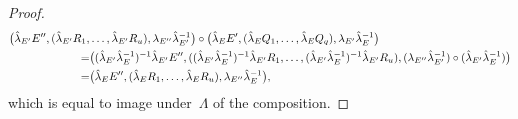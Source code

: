 \begin{proof}
\begin{align*}
\big(\hat{\lambda}_{E'}E'',(\hat{\lambda}_{E'}R_1,&\dots,\hat{\lambda}_{E'}R_u),\lambda_{E''}\hat{\lambda}_{E'}^{-1}\big)\circ \big(\hat{\lambda}_EE',(\hat{\lambda}_EQ_1,\dots,\hat{\lambda}_EQ_q),\lambda_{E'}\hat{\lambda}_E^{-1}\big)\\
=&\big((\hat{\lambda}_{E'}\hat{\lambda}_E^{-1})^{-1}\hat{\lambda}_{E'}E'',((\hat{\lambda}_{E'}\hat{\lambda}_E^{-1})^{-1}\hat{\lambda}_{E'}R_1,\dots,(\hat{\lambda}_{E'}\hat{\lambda}_E^{-1})^{-1}\hat{\lambda}_{E'}R_u),(\lambda_{E''}\hat{\lambda}_{E'}^{-1})\circ (\hat{\lambda}_{E'}\hat{\lambda}_E^{-1})\big)\\
=&\big(\hat{\lambda}_{E}E'',(\hat{\lambda}_{E}R_1,\dots,\hat{\lambda}_{E}R_u),\lambda_{E''}\hat{\lambda}_E^{-1}\big), 
\end{align*}
which is equal to image under~$\Lambda$ of the composition. 


\end{proof}
